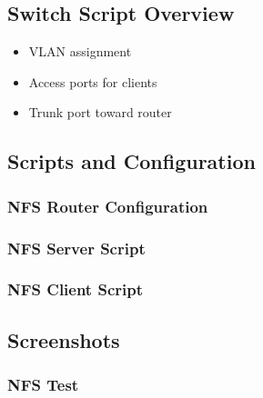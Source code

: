 \documentclass[12pt,a4paper]{article}
\begin{document}
\subsection{Switch Script Overview}

\begin{itemize}
  \item VLAN assignment
  \item Access ports for clients
  \item Trunk port toward router
\end{itemize}

\subsection{Scripts and Configuration}

\subsubsection{NFS Router Configuration}



\subsubsection{NFS Server Script}




\subsubsection{NFS Client Script}



\subsection{Screenshots}

\subsubsection{NFS Test}
\end{document}

